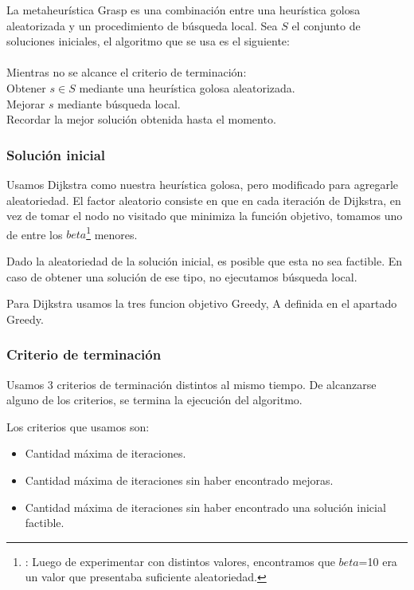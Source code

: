 La metaheurística Grasp es una combinación entre una heurística golosa aleatorizada y un procedimiento de búsqueda local.
Sea $S$ el conjunto de soluciones iniciales, el algoritmo que se usa es el siguiente:\\\\
\hspace*{1 cm} Mientras no se alcance el criterio de terminación:\\
\hspace*{2 cm} Obtener $s \in S$ mediante una heurística golosa aleatorizada.\\
\hspace*{2 cm} Mejorar $s$ mediante búsqueda local.\\
\hspace*{2 cm} Recordar la mejor solución obtenida hasta el momento.\\
\subsubsection{Solución inicial}

Usamos Dijkstra como nuestra heurística golosa, pero modificado para agregarle aleatoriedad. El factor aleatorio consiste en que en cada iteración de Dijkstra, en vez de tomar el nodo no visitado que minimiza la función objetivo, tomamos uno de entre los $beta$\footnote{\label{$beta$}: Luego de experimentar con distintos valores, encontramos que $beta$=10 era un valor que presentaba suficiente aleatoriedad.} menores.

Dado la aleatoriedad de la solución inicial, es posible que esta no sea factible. En caso de obtener una solución de ese tipo, no ejecutamos búsqueda local.

Para Dijkstra usamos la tres funcion objetivo Greedy, A definida en el apartado Greedy.

\subsubsection{Criterio de terminación}

Usamos 3 criterios de terminación distintos al mismo tiempo. De alcanzarse alguno de los criterios, se termina la ejecución del algoritmo.

Los criterios que usamos son:
\begin{itemize}
\item Cantidad máxima de iteraciones.
\item Cantidad máxima de iteraciones sin haber encontrado mejoras.
\item Cantidad máxima de iteraciones sin haber encontrado una solución inicial factible.
\end{itemize}

